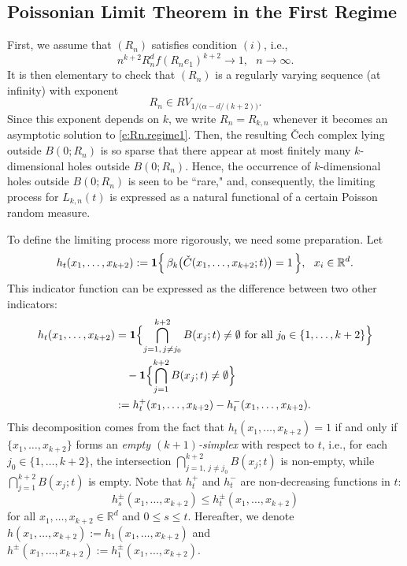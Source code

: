 \documentclass[11pt]{amsart}
\numberwithin{equation}{section}
\theoremstyle{plain}
\theoremstyle{definition}
\begin{document}
\subsection{Poissonian Limit Theorem in the First Regime}  \label{s:first.regime}

First, we assume that $(R_n)$ satisfies condition $(i)$, i.e.,
\begin{equation}  \label{e:Rn.regime1}
n^{k+2}R_n^d f(R_ne_1)^{k+2} \to 1, \ \ \ n\to\infty.
\end{equation}
It is then elementary to check that $(R_n)$ is a regularly varying sequence (at infinity) with exponent
$$
R_{n} \in RV_{1/\bigl( \alpha - d/(k+2) \bigr)}.
$$
Since this exponent depends on $k$, we write $R_n = R_{k,n}$ whenever it becomes an asymptotic solution to \eqref{e:Rn.regime1}. Then, the resulting \v{C}ech complex lying outside  $B(0; R_n)$ is so sparse that there appear at most finitely many $k$-dimensional holes outside $B(0; R_n)$. Hence, the occurrence of $k$-dimensional holes outside $B(0; R_n)$ is seen to be ``rare," and, consequently, the limiting process for $L_{k,n}(t)$ is expressed as a natural functional of a certain Poisson random measure.

To define the limiting process more rigorously, we need some preparation. Let
\begin{equation}  \label{e:def.ht}
h_t(x_1,\dots,x_{k+2}) := {{\bf 1}} \Bigl\{ \, \beta_k\bigl( \check{C}(x_1,\dots,x_{k+2}; t) \bigr) = 1\, \Bigr\}, \ \ x_i \in {{\mathbb R}}^d.
\end{equation}
This indicator function can be expressed as the difference between two other indicators:
\begin{align}
h_t(x_1,\dots,x_{k+2}) &= {{\bf 1}} \Bigl\{ \bigcap_{j=1, \, j \neq j_0}^{k+2} B(x_j; t) \neq \emptyset \ \text{for all } j_0 \in \{ 1,\dots,k+2 \} \Bigr\} \label{e:decomp.ind} \\
&\quad - {{\bf 1}} \Bigl\{ \bigcap_{j=1}^{k+2} B(x_j; t) \neq \emptyset \Bigr\} \notag \\
&:= h_t^+(x_1,\dots,x_{k+2}) - h_t^-(x_1,\dots,x_{k+2}).  \notag
\end{align}
This decomposition comes from the fact that $h_t(x_1,\dots,x_{k+2}) = 1$ if and only if $\{x_1,\dots,x_{k+2}  \}$ forms an \textit{empty $(k+1)$-simplex} with respect to $t$, i.e., for each $j_0 \in \{ 1,\dots,k+2 \}$, the intersection $\bigcap_{j=1, \, j \neq j_0}^{k+2} B(x_j; t)$ is non-empty, while $\bigcap_{j=1}^{k+2} B(x_j; t)$ is empty. Note that $h_t^+$ and $h_t^-$ are non-decreasing functions in $t$:
\begin{equation}  \label{e:increase.ht}
h_s^{\pm}(x_1,\dots,x_{k+2}) \leq h_t^{\pm}(x_1,\dots,x_{k+2})
\end{equation}
for all $x_1,\dots,x_{k+2} \in {{\mathbb R}}^d$ and $0\leq s \leq t$.
Hereafter, we denote $h(x_1,\dots,x_{k+2}) := h_1(x_1,\dots,x_{k+2})$ and $h^{\pm}(x_1,\dots,x_{k+2}) := h_1^{\pm}(x_1,\dots,x_{k+2})$.
\end{document}

